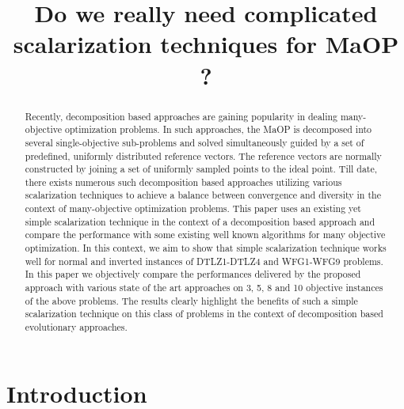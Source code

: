 \documentclass{sig-alternate}
\begin{document}
 
\title{Do we really need complicated scalarization techniques for MaOP ?}

\maketitle
\begin{abstract} 
Recently, decomposition based approaches are gaining popularity in dealing many-objective optimization problems. In such approaches, the MaOP is decomposed into several single-objective sub-problems and solved simultaneously guided by a set of predefined, uniformly distributed reference vectors. The reference vectors are normally constructed by joining a set of uniformly sampled points to the ideal point. Till date, there exists numerous such decomposition based approaches utilizing various scalarization techniques to achieve a balance between convergence and diversity in the context of many-objective optimization problems. This paper uses an existing yet simple scalarization technique in the context of a decomposition based approach and compare the performance with some existing well known algorithms for many objective optimization. In this context, we aim to show that simple scalarization technique works well for normal and inverted instances of DTLZ1-DTLZ4 and WFG1-WFG9 problems. In this paper we objectively compare the performances delivered by the proposed approach with various state of the art approaches on 3, 5, 8 and 10 objective instances of the above problems. The results clearly highlight the benefits of such a simple scalarization technique on this class of problems in the context of decomposition based evolutionary approaches.\\ 
\end{abstract}



\section{Introduction} 
\end{document}
